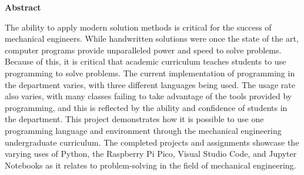 \begin{flushleft}
    \Large
    \textbf{Abstract}
    \normalsize
    \thispagestyle{empty}
\end{flushleft}

The ability to apply modern solution methods is critical for the success
of mechanical engineers. While handwritten solutions were once the 
state of the art, computer programs provide unparalleled power and speed 
to solve problems. Because of this, it is critical that academic 
curriculum teaches students to use programming to solve problems.
The current implementation of programming in the department varies,
with three different languages being used. The usage rate also varies,
with many classes failing to take advantage of the tools provided by
programming, and this is reflected by the ability and confidence of
students in the department.
This project demonstrates how it is possible to use one programming 
language and environment through the mechanical engineering
undergraduate curriculum. The completed projects and assignments
showcase the varying uses of Python, the Raspberry Pi Pico, Visual
Studio Code, and Jupyter Notebooks as it relates to problem-solving
in the field of mechanical engineering.
